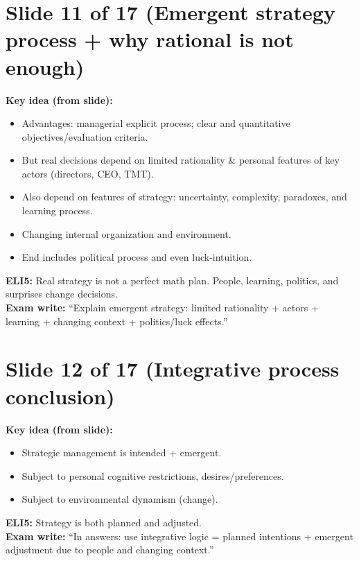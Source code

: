 \documentclass[11pt,a4paper]{article}
\begin{document}
\section*{Slide 11 of 17 (Emergent strategy process + why rational is not enough)}
\textbf{Key idea (from slide):}
\begin{itemize}
  \item Advantages: managerial explicit process; clear and quantitative objectives/evaluation criteria.
\item But real decisions depend on limited rationality \& personal features of key actors (directors, CEO, TMT).
  \item Also depend on features of strategy: uncertainty, complexity, paradoxes, and learning process.
  \item Changing internal organization and environment.
  \item End includes political process and even luck-intuition.
\end{itemize}
\textbf{ELI5:} Real strategy is not a perfect math plan. People, learning, politics, and surprises change decisions.\\
\textbf{Exam write:} ``Explain emergent strategy: limited rationality + actors + learning + changing context + politics/luck effects.''

\section*{Slide 12 of 17 (Integrative process conclusion)}
\textbf{Key idea (from slide):}
\begin{itemize}
  \item Strategic management is intended + emergent.
  \item Subject to personal cognitive restrictions, desires/preferences.
  \item Subject to environmental dynamism (change).
\end{itemize}
\textbf{ELI5:} Strategy is both planned and adjusted.\\
\textbf{Exam write:} ``In answers: use integrative logic = planned intentions + emergent adjustment due to people and changing context.''

\end{document}

